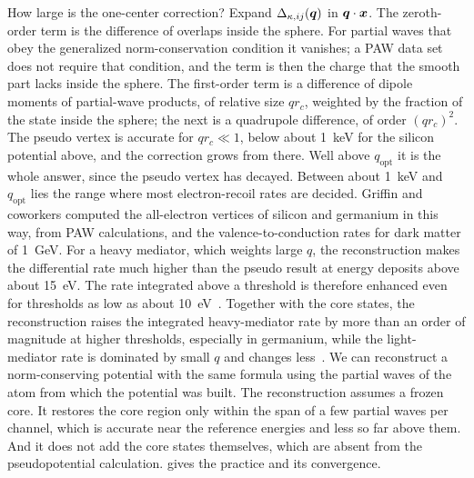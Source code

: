 How large is the one-center correction? Expand $\Delta_{\kappa,ij}(\bm{q})$ in $\bm{q}\cdot\bm{x}$. The zeroth-order term is the difference of overlaps inside the sphere. For partial waves that obey the generalized norm-conservation condition it vanishes; a PAW data set does not require that condition, and the term is then the charge that the smooth part lacks inside the sphere. The first-order term is a difference of dipole moments of partial-wave products, of relative size $qr_c$, weighted by the fraction of the state inside the sphere; the next is a quadrupole difference, of order $(qr_c)^2$. The pseudo vertex is accurate for $qr_c \ll 1$, below about \SI{1}{keV} for the silicon potential above, and the correction grows from there. Well above $q_{\mathrm{opt}}$ it is the whole answer, since the pseudo vertex has decayed. Between about \SI{1}{keV} and $q_{\mathrm{opt}}$ lies the range where most electron-recoil rates are decided. Griffin and coworkers computed the all-electron vertices of silicon and germanium in this way, from PAW calculations, and the valence-to-conduction rates for dark matter of \SI{1}{GeV}. For a heavy mediator, which weights large $q$, the reconstruction makes the differential rate much higher than the pseudo result at energy deposits above about \SI{15}{eV}. The rate integrated above a threshold is therefore enhanced even for thresholds as low as about \SI{10}{eV}~\cite[Sects.~1 and~3.1]{griffin2021extended}. Together with the core states, the reconstruction raises the integrated heavy-mediator rate by more than an order of magnitude at higher thresholds, especially in germanium, while the light-mediator rate is dominated by small $q$ and changes less~\cite[Sects.~3.1 and~4]{griffin2021extended}. We can reconstruct a norm-conserving potential with the same formula using the partial waves of the atom from which the potential was built. The reconstruction assumes a frozen core. It restores the core region only within the span of a few partial waves per channel, which is accurate near the reference energies and less so far above them. And it does not add the core states themselves, which are absent from the pseudopotential calculation.  gives the practice and its convergence.

